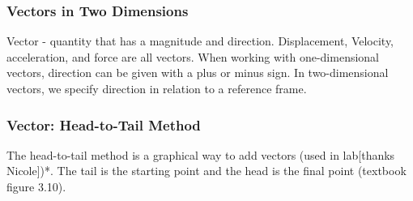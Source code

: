 \documentclass{article}
\begin{document}
\subsubsection{Vectors in Two Dimensions}
Vector - quantity that has a magnitude and direction.
Displacement, Velocity, acceleration, and force are all vectors.
When working with one-dimensional vectors, direction can be given with a plus or minus sign.
In two-dimensional vectors, we specify direction in relation to a reference frame.

\subsubsection{Vector: Head-to-Tail Method}
The head-to-tail method is a graphical way to add vectors (used in lab[thanks Nicole])*. The tail is the starting point and the head is the final point (textbook figure 3.10).
\end{document}
